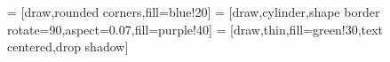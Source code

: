 




 = [draw,rounded corners,fill=blue!20]
 = [draw,cylinder,shape border rotate=90,aspect=0.07,fill=purple!40]
 = [draw,thin,fill=green!30,text centered,drop shadow]




